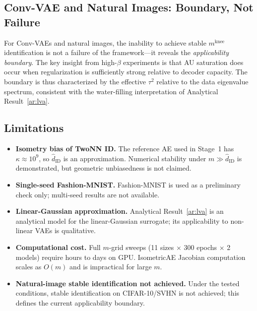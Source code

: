 \documentclass[make,article,submit,pdftex,moreauthors]{Definitions/mdpi}
\newcommand{\kap}{\kappa}
\newcommand{\mknee}{m^{\mathrm{knee}}}
\newcommand{\hatdID}{\hat{d}_{\mathrm{ID}}}
\begin{document}
\subsection{Conv-VAE and Natural Images: Boundary, Not Failure}\label{sec:disc_boundary}

For Conv-VAEs and natural images, the inability to achieve stable $\mknee$
identification is not a failure of the framework---it reveals the
\emph{applicability boundary}.
The key insight from high-$\beta$ experiments is that AU saturation does occur
when regularization is sufficiently strong relative to decoder capacity.
The boundary is thus characterized by the effective $\tau^2$ relative to the
data eigenvalue spectrum, consistent with the water-filling interpretation of
Analytical Result~\ref{ar:lva}.

\subsection{Limitations}\label{sec:disc_limitation}

\begin{itemize}
\item \textbf{Isometry bias of TwoNN ID.}
The reference AE used in Stage~1 has $\kap\approx10^9$, so $\hatdID$ is an
approximation.
Numerical stability under $m\gg\hatdID$ is demonstrated, but geometric
unbiasedness is not claimed.

\item \textbf{Single-seed Fashion-MNIST.}
Fashion-MNIST is used as a preliminary check only; multi-seed results are not
available.

\item \textbf{Linear-Gaussian approximation.}
Analytical Result~\ref{ar:lva} is an analytical model for the linear-Gaussian
surrogate; its applicability to non-linear VAEs is qualitative.

\item \textbf{Computational cost.}
Full $m$-grid sweeps (11 sizes $\times$ 300 epochs $\times$ 2 models) require
hours to days on GPU.
IsometricAE Jacobian computation scales as $O(m)$ and is impractical for large $m$.

\item \textbf{Natural-image stable identification not achieved.}
Under the tested conditions, stable identification on CIFAR-10/SVHN is not
achieved; this defines the current applicability boundary.
\end{itemize}

\end{document}
